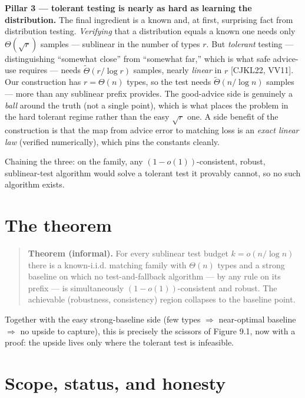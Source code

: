 \textbf{Pillar 3 --- tolerant testing is nearly as hard as learning the distribution.} The final
ingredient is a known and, at first, surprising fact from distribution testing. \emph{Verifying}
that a distribution equals a known one needs only \(\Theta(\sqrt r)\) samples --- sublinear in
the number of types \(r\). But \emph{tolerant} testing --- distinguishing ``somewhat close'' from
``somewhat far,'' which is what safe advice-use requires --- needs \(\tilde\Theta(r/\log r)\)
samples, nearly \emph{linear} in \(r\) {[}CJKL22, VV11{]}. Our construction has \(r=\Theta(n)\) types, so
the test needs \(\tilde\Theta(n/\log n)\) samples --- more than any sublinear prefix provides.
The good-advice side is genuinely a \emph{ball} around the truth (not a single point), which is
what places the problem in the hard tolerant regime rather than the easy \(\sqrt r\) one. A
side benefit of the construction is that the map from advice error to matching loss is an
\emph{exact linear law} (verified numerically), which pins the constants cleanly.

Chaining the three: on the family, any \((1-o(1))\)-consistent, robust, sublinear-test
algorithm would solve a tolerant test it provably cannot, so no such algorithm exists.

\section{The theorem}\label{the-theorem}

\begin{quote}
\textbf{Theorem (informal).} For every sublinear test budget \(k=o(n/\log n)\) there is a
known-i.i.d. matching family with \(\Theta(n)\) types and a strong baseline on which no
test-and-fallback algorithm --- by any rule on its prefix --- is simultaneously
\((1-o(1))\)-consistent and robust. The achievable (robustness, consistency) region collapses
to the baseline point.
\end{quote}

Together with the easy strong-baseline side (few types \(\Rightarrow\) near-optimal baseline
\(\Rightarrow\) no upside to capture), this is precisely the scissors of Figure 9.1, now with a
proof: the upside lives only where the tolerant test is infeasible.

\section{Scope, status, and honesty}\label{scope-status-and-honesty}

